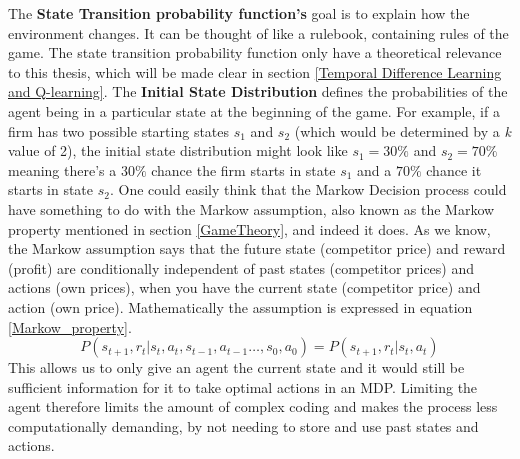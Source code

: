 \documentclass{article}
\begin{document}
\newline
The \textbf{State Transition probability function's} goal is to explain how the environment changes. It can be thought of like a rulebook, containing rules of the game. The state transition probability function only have a theoretical relevance to this thesis, which will be made clear in section \ref{Temporal Difference Learning and Q-learning}. 
\newline
The \textbf{Initial State Distribution} defines the probabilities of the agent being in a particular state at the beginning of the game. For example, if a firm has two possible starting states $s_1$ and $s_2$ (which would be determined by a \textit{k} value of 2), the initial state distribution might look like $s_1=30\%$ and $s_2 = 70\%$ meaning there's a $30\%$ chance the firm starts in state $s_1$ and a $70\%$ chance it starts in state $s_2$.
\newline 
\newline 
One could easily think that the Markow Decision process could have something to do with the Markow assumption, also known as the Markow property mentioned in section \ref{GameTheory}, and indeed it does. 
As we know, the Markow assumption says that the future state (competitor price) and reward (profit) are conditionally independent of past states (competitor prices) and actions (own prices), when you have the current state (competitor price) and action (own price). Mathematically the assumption is expressed in equation \ref{Markow_property}.
\begin{equation}
\label{Markow_property}
P(s_{t+1}, r_t | s_t, a_t, s_{t-1},a_{t-1} \dots, s_0, a_0) = P(s_{t+1}, r_t | s_t, a_t)
\end{equation}
This allows us to only give an agent the current state and it would still be sufficient information for it to take optimal actions in an MDP\citep[p. 23]{marl-book}. 
Limiting the agent therefore limits the amount of complex coding and makes the process less computationally demanding, by not needing to store and use past states and actions.
\end{document}
